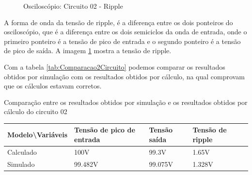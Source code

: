 \begin{figure}[H]
    \centering
    \caption{Osciloscópio: Circuito 02 - Ripple}
    \vspace{-0.3cm}
    \label{fig:OsciloscopioCircuito02Ripple}
\end{figure}

A forma de onda da tensão de ripple, é a diferença entre os dois ponteiros do osciloscópio, que é a diferença entre os dois semiciclos da onda de entrada, onde o primeiro ponteiro é a tensão de pico de entrada e o segundo ponteiro é a tensão de pico de saída. A imagem \ref{fig:OsciloscopioCircuito02Ripple} mostra a tensão de ripple.

Com a tabela \ref{tab:Comparacao2Circuito} podemos comparar os resultados obtidos por simulação com os resultados obtidos por cálculo, na qual comprovam que os cálculos estavam corretos.

\begin{quadro}[H]
    \centering
    \caption{Comparação entre os resultados obtidos por simulação e os resultados obtidos por cálculo do circuito 02}
    \begin{tabular}{|C{0.19\textwidth}|C{0.24\textwidth}|C{0.24\textwidth}|C{0.24\textwidth}|C{0.24\textwidth}|}
        \hline
        \textbf{Modelo\textbackslash{}Variáveis} & \textbf{Tensão de pico de entrada} & \textbf{Tensão saída} & \textbf{Tensão de ripple}\\
        \hline
        Calculado & 100V & 99.3V & 1.65V \\
        \hline
        Simulado & 99.482V & 99.075V & 1.328V \\
        \hline
    \end{tabular}
    \vspace{-0.6cm}
    \label{tab:Comparacao2Circuito}
\end{quadro}

